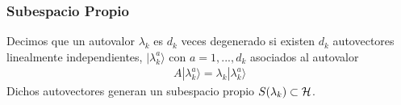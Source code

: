 \documentclass[letterpaper,10pt,english]{jupyterBook}
\newcommand{\ket}[1]{|#1\rangle}
\newcommand{\Hil}{{\cal H}}
\begin{document}
\subsubsection{Subespacio Propio}
\label{\detokenize{docs/Part_01_Formalismo/Chapter_01_02_Formalismo_matem_xe1tico/01_03_Operadores_myst:subespacio-propio}}
\sphinxAtStartPar
Decimos que un autovalor \(\lambda_k\) es \(d_k\) veces degenerado si existen \(d_k\) autovectores linealmente independientes,  \(\ket{\lambda_k^{a}}\) con \(a=1,...,d_k\) asociados al  autovalor
\begin{equation*}
\begin{split}A\ket{\lambda_k^a} = \lambda_k \ket{\lambda_k^a}\end{split}
\end{equation*}
\sphinxAtStartPar
Dichos autovectores generan un subespacio propio \(S(\lambda_k)\subset \Hil\).
\end{document}
